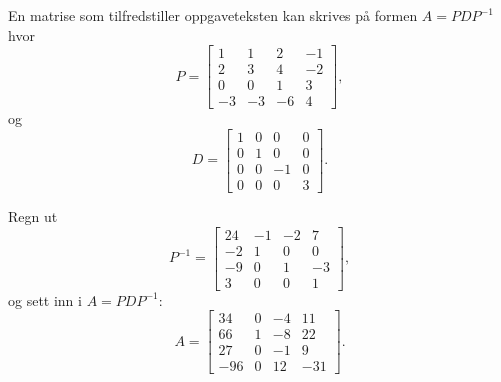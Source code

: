 \documentclass[notitlepage,a4paper,12pt,norsk]{IMFeksamen}
\newcommand{\0}{\V{0}}
\newcommand{\oppgslutt}{
\begin{center}
\pgfornament[width=6cm]{88}
\end{center}
}
\newenvironment{losning}{\begin{oppgave}}{\oppgslutt\end{oppgave}}
\begin{document}
\begin{losning}
En matrise som tilfredstiller oppgaveteksten kan skrives på formen $A=PDP^{-1}$ hvor
\[
P=\begin{bmatrix}
1  & 1  & 2  & -1 \\
2  & 3  & 4  & -2 \\
0  & 0  & 1  & 3  \\
-3 & -3 & -6 & 4
\end{bmatrix},
\]
og
\[
D=\begin{bmatrix}
1 & 0 & 0  & 0 \\
0 & 1 & 0  & 0 \\
0 & 0 &-1  & 0  \\
0 & 0 & 0  & 3
\end{bmatrix}.
\]

Regn ut
\[
P^{-1}=\begin{bmatrix}
24 & -1 & -2 & 7  \\
-2 & 1  & 0  & 0  \\
-9 & 0  & 1  & -3 \\
3  & 0  & 0  & 1
\end{bmatrix},
\]
og sett inn i $A=PDP^{-1}$:
\[
A=\begin{bmatrix}
34  & 0 & -4 & 11 \\
66  & 1 & -8 & 22 \\
27  & 0 & -1 & 9  \\
-96 & 0 & 12 & -31
\end{bmatrix}.
\]


\end{losning}
\end{document}
